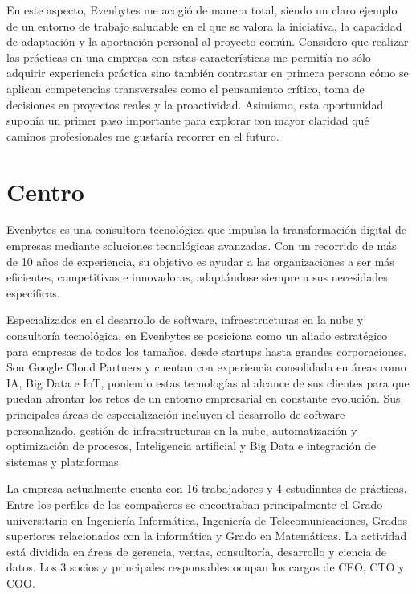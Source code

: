 En este aspecto, Evenbytes me acogió de manera total, siendo un claro ejemplo de un entorno de trabajo saludable en el que se valora la iniciativa, la capacidad de adaptación y la aportación personal al proyecto común. Considero que realizar las prácticas en una empresa con estas características me permitía no sólo adquirir experiencia práctica sino también contrastar en primera persona cómo se aplican competencias transversales como el pensamiento crítico, toma de decisiones en proyectos reales y la proactividad. Asimismo, esta oportunidad suponía un primer paso importante para explorar con mayor claridad qué caminos profesionales me gustaría recorrer en el futuro.
%
%
\section{Centro} \label{centro}
%
%
Evenbytes es una consultora tecnológica que impulsa la transformación digital de empresas mediante soluciones tecnológicas avanzadas. Con un recorrido de más de 10 años de experiencia, su objetivo es ayudar a las organizaciones a ser más eficientes, competitivas e innovadoras, adaptándose siempre a sus necesidades específicas.

Especializados en el desarrollo de software, infraestructuras en la nube y consultoría tecnológica, en Evenbytes se posiciona como un aliado estratégico para empresas de todos los tamaños, desde startups hasta grandes corporaciones. Son Google Cloud Partners y cuentan con experiencia consolidada en áreas como IA, Big Data e IoT, poniendo estas tecnologías al alcance de sus clientes para que puedan afrontar los retos de un entorno empresarial en constante evolución. Sus principales áreas de especialización incluyen el desarrollo de software personalizado, gestión de infraestructuras en la nube, automatización y optimización de procesos, Inteligencia artificial y Big Data e integración de sistemas y plataformas.

La empresa actualmente cuenta con 16 trabajadores y 4 estudinntes de prácticas. Entre los perfiles de los compañeros se encontraban principalmente el Grado universitario en Ingeniería Informática, Ingeniería de Telecomunicaciones, Grados superiores relacionados con la informática y Grado en Matemáticas. La actividad está dividida en áreas de gerencia, ventas, consultoría, desarrollo y ciencia de datos. Los 3 socios y principales responsables ocupan los cargos de CEO, CTO y COO.

%
%
